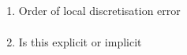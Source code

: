 \documentclass{X:/Documents/Coding/Latex/myassignment}
\begin{document}
\begin{enumerate}
\begin{enumerate}
        \item Order of local discretisation error
        \begin{align*}
            
        \end{align*}
        \item Is this explicit or implicit
        \begin{align*}
             
        \end{align*} 
    \end{enumerate}
\end{enumerate}
\end{document}
